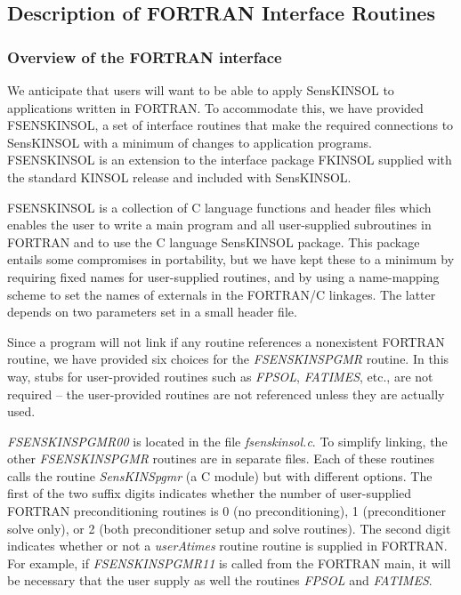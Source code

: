 \documentclass[11pt]{article}
\begin{document}
\subsection{Description of FORTRAN Interface Routines}
\subsubsection{Overview of the FORTRAN interface}

We anticipate that users will want to be able to apply SensKINSOL to
applications written in FORTRAN. To accommodate this, we have provided
FSENSKINSOL, a set of interface routines that make the required
connections to SensKINSOL with a minimum of changes to application
programs. FSENSKINSOL is an extension to the interface package FKINSOL
supplied with the standard KINSOL release and included with
SensKINSOL.

FSENSKINSOL is a collection of C language functions and header files
which enables the user to write a main program and all user-supplied
subroutines in FORTRAN and to use the C language SensKINSOL package.
This package entails some compromises in portability, but we have kept
these to a minimum by requiring fixed names for user-supplied
routines, and by using a name-mapping scheme to set the names of
externals in the FORTRAN/C linkages. The latter depends on two
parameters set in a small header file.

Since a program will not link if any routine references a nonexistent
FORTRAN routine, we have provided six choices for the {\em
FSENSKINSPGMR} routine. In this way, stubs for user-provided routines
such as {\em FPSOL}, {\em FATIMES}, etc., are not required -- the
user-provided routines are not referenced unless they are actually
used.

{\em FSENSKINSPGMR00} is located in the file {\em fsenskinsol.c}. To
simplify linking, the other {\em FSENSKINSPGMR} routines are in
separate files. Each of these routines calls the routine {\em
SensKINSpgmr} (a C module) but with different options. The first of the
two suffix digits indicates whether the number of user-supplied FORTRAN
preconditioning routines is 0 (no preconditioning), 1 (preconditioner
solve only), or 2 (both preconditioner setup and solve routines). The
second digit indicates whether or not a {\em userAtimes} routine
routine is supplied in FORTRAN. For example, if {\em FSENSKINSPGMR11}
is called from the FORTRAN main, it will be necessary that the user
supply as well the routines {\em FPSOL} and {\em FATIMES}.
\end{document}
